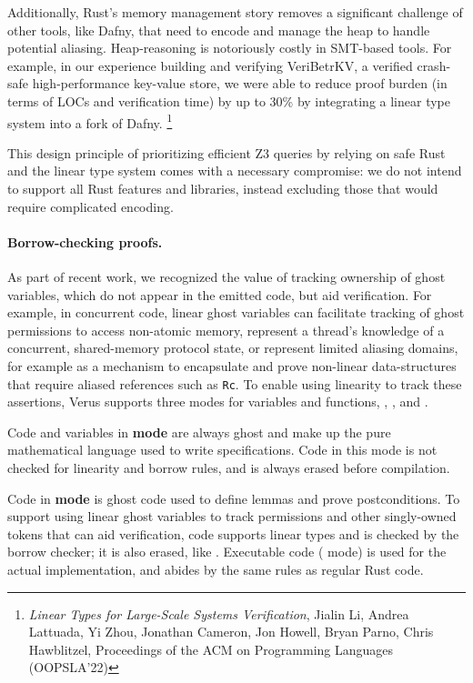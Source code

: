 \documentclass[10pt]{article}
\newcommand{\codesize}{\fontsize{8pt}{9pt}\selectfont}
\newcommand{\textcode}[1]{{\codesize\ttfamily{#1}}}
\renewcommand{\section}[1]{\paragraph{#1.}}
\begin{document}
Additionally, Rust's memory management story removes a significant
challenge of other tools, like Dafny, that need to encode and manage the
heap to handle potential aliasing. Heap-reasoning is notoriously costly in SMT-based tools.
For example, in our experience building and verifying VeriBetrKV, a verified crash-safe
high-performance key-value store, we were able to reduce proof burden
(in terms of LOCs and verification time) by up to 30\% by integrating a
linear type system into a fork of Dafny.%
\footnote{\textit{Linear Types for Large-Scale Systems Verification}, Jialin Li, Andrea Lattuada, Yi Zhou, Jonathan Cameron, Jon Howell, Bryan Parno, Chris Hawblitzel, Proceedings of the ACM on Programming Languages (OOPSLA'22)}

This design principle of prioritizing efficient Z3 queries
by relying on safe Rust and the linear type system
comes with a necessary compromise:
we do not intend to support all Rust features and libraries,
instead excluding those that would
require complicated encoding.

\section{Borrow-checking proofs}\label{borrow-checking-proofs}

As part of recent work, we recognized the value
of tracking ownership of ghost variables, which do not appear in the
emitted code, but aid verification. For example, in concurrent code,
linear ghost variables can facilitate tracking of ghost permissions to
access non-atomic memory, represent a thread's knowledge of a
concurrent, shared-memory protocol state, or represent limited
aliasing domains, for example as a mechanism to encapsulate and prove
non-linear data-structures that require aliased references such as
\texttt{Rc}. To enable using linearity to track these assertions,
Verus supports three modes for variables and functions,
\textbf{\textcode{\#{[}spec{]}}}, \textbf{\textcode{\#{[}proof{]}}}, and
\textbf{\textcode{\#{[}exec{]}}}.

Code and variables in \textbf{\textcode{\#{[}spec{]}} mode} are always
ghost and make up the pure mathematical language used to write specifications.
Code in this mode is not checked for linearity and borrow rules,
and is always erased before compilation.

Code in \textbf{\textcode{\#{[}proof{]}} mode} is ghost code used to
define lemmas and prove postconditions.
To support using linear ghost variables to track permissions and
other singly-owned tokens that can aid verification, \textcode{proof}
code supports linear types and is checked by the borrow checker; it
is also erased, like \textcode{spec}.
Executable code (\textbf{\textcode{\#{[}exec{]}}} mode) is used for the
actual implementation, and abides by the same rules as regular Rust code.
\end{document}

